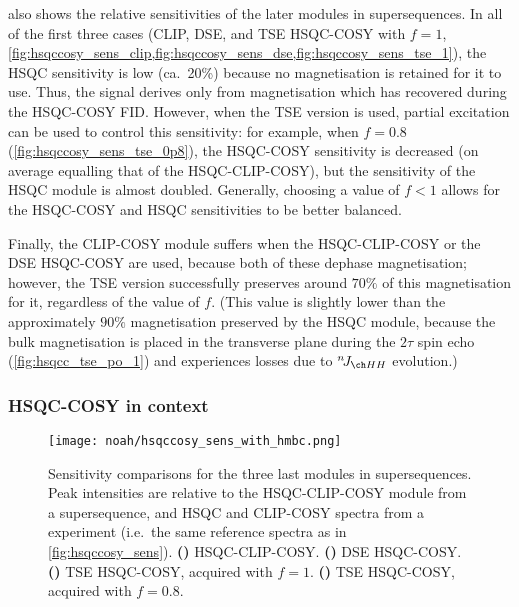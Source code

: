  also shows the relative sensitivities of the later modules in  supersequences.
In all of the first three cases (CLIP, DSE, and TSE HSQC-COSY with $f = 1$, \cref{fig:hsqccosy_sens_clip,fig:hsqccosy_sens_dse,fig:hsqccosy_sens_tse_1}), the HSQC sensitivity is low (ca.\ 20\%) because no  magnetisation is retained for it to use.
Thus, the signal derives only from  magnetisation which has recovered during the HSQC-COSY FID.
However, when the TSE version is used, partial  excitation can be used to control this sensitivity: for example, when $f = 0.8$ (\cref{fig:hsqccosy_sens_tse_0p8}), the HSQC-COSY sensitivity is decreased (on average equalling that of the HSQC-CLIP-COSY), but the sensitivity of the HSQC module is almost doubled.
Generally, choosing a value of $f < 1$ allows for the HSQC-COSY and HSQC sensitivities to be better balanced.

Finally, the CLIP-COSY module suffers when the HSQC-CLIP-COSY or the DSE HSQC-COSY are used, because both of these dephase  magnetisation;
however, the TSE version successfully preserves around $70\%$ of this magnetisation for it, regardless of the value of $f$.
(This value is slightly lower than the approximately $90\%$ magnetisation preserved by the HSQC module, because the bulk magnetisation is placed in the transverse plane during the $2\tau$ spin echo (\cref{fig:hsqcc_tse_po_1}) and experiences losses due to $\nJ{HH}$ evolution.)


\subsubsection{HSQC-COSY in context}

\begin{figure}[!ht]
    \centering
    \texttt{[image: noah/hsqccosy\_sens\_with\_hmbc.png]}%
    {\label{fig:hsqccosy_sens_with_hmbc_clip}}%
    {\label{fig:hsqccosy_sens_with_hmbc_dse}}%
    {\label{fig:hsqccosy_sens_with_hmbc_tse_1}}%
    {\label{fig:hsqccosy_sens_with_hmbc_tse_0p8}}%
    \caption[Sensitivity comparisons for  supersequences]{
        Sensitivity comparisons for the three last modules in  supersequences.
        Peak intensities are relative to the HSQC-CLIP-COSY module from a  supersequence, and HSQC and CLIP-COSY spectra from a  experiment (i.e.\ the same reference spectra as in \cref{fig:hsqccosy_sens}).
        \textbf{()} HSQC-CLIP-COSY.
        \textbf{()} DSE HSQC-COSY.
        \textbf{()} TSE HSQC-COSY, acquired with $f = 1$.
        \textbf{()} TSE HSQC-COSY, acquired with $f = 0.8$.
    }
    \label{fig:hsqccosy_sens_with_hmbc}
\end{figure}

